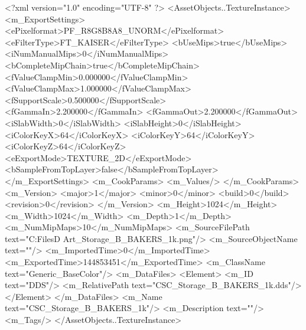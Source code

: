 <?xml version="1.0" encoding="UTF-8" ?>
<AssetObjects..TextureInstance>
	<m_ExportSettings>
		<ePixelformat>PF_R8G8B8A8_UNORM</ePixelformat>
		<eFilterType>FT_KAISER</eFilterType>
		<bUseMips>true</bUseMips>
		<iNumManualMips>0</iNumManualMips>
		<bCompleteMipChain>true</bCompleteMipChain>
		<fValueClampMin>0.000000</fValueClampMin>
		<fValueClampMax>1.000000</fValueClampMax>
		<fSupportScale>0.500000</fSupportScale>
		<fGammaIn>2.200000</fGammaIn>
		<fGammaOut>2.200000</fGammaOut>
		<iSlabWidth>0</iSlabWidth>
		<iSlabHeight>0</iSlabHeight>
		<iColorKeyX>64</iColorKeyX>
		<iColorKeyY>64</iColorKeyY>
		<iColorKeyZ>64</iColorKeyZ>
		<eExportMode>TEXTURE_2D</eExportMode>
		<bSampleFromTopLayer>false</bSampleFromTopLayer>
	</m_ExportSettings>
	<m_CookParams>
		<m_Values/>
	</m_CookParams>
	<m_Version>
		<major>1</major>
		<minor>0</minor>
		<build>0</build>
		<revision>0</revision>
	</m_Version>
	<m_Height>1024</m_Height>
	<m_Width>1024</m_Width>
	<m_Depth>1</m_Depth>
	<m_NumMipMaps>10</m_NumMipMaps>
	<m_SourceFilePath text="C:\Users\Shadow\Desktop\Working Files\3D Art\Textures\CSC_Storage_B_BAKERS_1k.png"/>
	<m_SourceObjectName text=""/>
	<m_ImportedTime>0</m_ImportedTime>
	<m_ExportedTime>144853451</m_ExportedTime>
	<m_ClassName text="Generic_BaseColor"/>
	<m_DataFiles>
		<Element>
			<m_ID text="DDS"/>
			<m_RelativePath text="CSC_Storage_B_BAKERS_1k.dds"/>
		</Element>
	</m_DataFiles>
	<m_Name text="CSC_Storage_B_BAKERS_1k"/>
	<m_Description text=""/>
	<m_Tags/>
</AssetObjects..TextureInstance>

